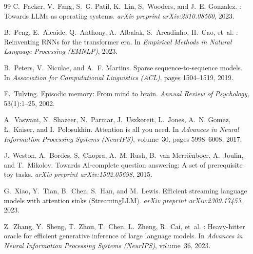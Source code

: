 \documentclass[11pt,a4paper]{article}
\begin{document}
\begin{thebibliography}{99}
C.~Packer, V.~Fang, S.~G. Patil, K.~Lin, S.~Wooders, and J.~E. Gonzalez.
: Towards {LLMs} as operating systems.
\newblock \emph{arXiv preprint arXiv:2310.08560}, 2023.

B.~Peng, E.~Alcaide, Q.~Anthony, A.~Albalak, S.~Arcadinho, H.~Cao, et~al.
: Reinventing {RNNs} for the transformer era.
\newblock In \emph{Empirical Methods in Natural Language Processing (EMNLP)}, 2023.

B.~Peters, V.~Niculae, and A.~F. Martins.
\newblock Sparse sequence-to-sequence models.
\newblock In \emph{Association for Computational Linguistics (ACL)}, pages 1504--1519, 2019.

E.~Tulving.
\newblock Episodic memory: From mind to brain.
\newblock \emph{Annual Review of Psychology}, 53(1):1--25, 2002.

A.~Vaswani, N.~Shazeer, N.~Parmar, J.~Uszkoreit, L.~Jones, A.~N. Gomez, {\L}.~Kaiser, and I.~Polosukhin.
\newblock Attention is all you need.
\newblock In \emph{Advances in Neural Information Processing Systems (NeurIPS)}, volume~30, pages 5998--6008, 2017.

J.~Weston, A.~Bordes, S.~Chopra, A.~M. Rush, B.~van Merri{\"e}nboer, A.~Joulin, and T.~Mikolov.
\newblock Towards {AI}-complete question answering: A set of prerequisite toy tasks.
\newblock \emph{arXiv preprint arXiv:1502.05698}, 2015.

G.~Xiao, Y.~Tian, B.~Chen, S.~Han, and M.~Lewis.
\newblock Efficient streaming language models with attention sinks ({StreamingLLM}).
\newblock \emph{arXiv preprint arXiv:2309.17453}, 2023.

Z.~Zhang, Y.~Sheng, T.~Zhou, T.~Chen, L.~Zheng, R.~Cai, et~al.
: Heavy-hitter oracle for efficient generative inference of large language models.
\newblock In \emph{Advances in Neural Information Processing Systems (NeurIPS)}, volume~36, 2023.

\end{thebibliography}
\end{document}
